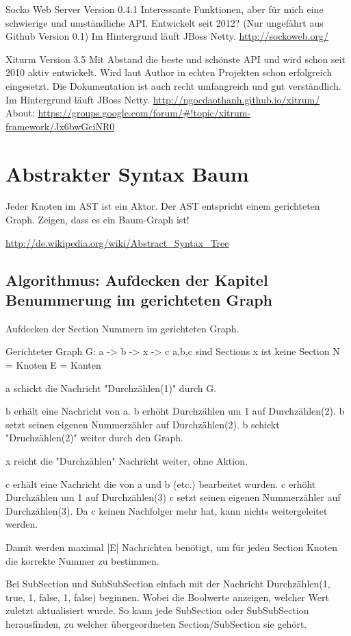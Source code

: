 Socko Web Server Version 0.4.1
Interessante Funktionen, aber für mich eine schwierige und umständliche API.
Entwickelt seit 2012? (Nur ungefährt aus Github Version 0.1)
Im Hintergrund läuft JBoss Netty.
\url{http://sockoweb.org/}

Xiturm Version 3.5
Mit Abstand die beste und schönste API und wird schon seit 2010 aktiv entwickelt.
Wird laut Author in echten Projekten schon erfolgreich eingesetzt.
Die Dokumentation ist auch recht umfangreich und gut verständlich.
Im Hintergrund läuft JBoss Netty.
\url{http://ngocdaothanh.github.io/xitrum/}
About: \url{https://groups.google.com/forum/#!topic/xitrum-framework/Jx6bwGciNR0}


\section{Abstrakter Syntax Baum}

Jeder Knoten im AST ist ein Aktor. Der AST entspricht einem gerichteten Graph.
Zeigen, dass es ein Baum-Graph ist!

\url{http://de.wikipedia.org/wiki/Abstract_Syntax_Tree}


\subsection{Algorithmus: Aufdecken der Kapitel Benummerung im gerichteten Graph}

Aufdecken der Section Nummern im gerichteten Graph.

Gerichteter Graph G: a -> b -> x -> c
a,b,c sind Sections
x ist keine Section
N = Knoten
E = Kanten

a schickt die Nachricht "Durchzählen(1)" durch G.

b erhält eine Nachricht von a.
b erhöht Durchzählen um 1 auf Durchzählen(2).
b setzt seinen eigenen Nummerzähler auf Durchzählen(2).
b schickt "Druchzählen(2)" weiter durch den Graph.

x reicht die "Durchzählen" Nachricht weiter, ohne Aktion.

c erhält eine Nachricht die von a und b (etc.) bearbeitet wurden.
c erhöht Durchzählen um 1 auf Durchzählen(3)
c setzt seinen eigenen Nummerzähler auf Durchzählen(3).
Da c keinen Nachfolger mehr hat, kann nichts weitergeleitet werden.

Damit werden maximal |E| Nachrichten benötigt, um für jeden Section Knoten
die korrekte Nummer zu bestimmen.


Bei SubSection und SubSubSection einfach mit der
Nachricht Durchzählen(1, true, 1, false, 1, false) beginnen.
Wobei die Boolwerte anzeigen, welcher Wert zuletzt aktualisiert wurde.
So kann jede SubSection oder SubSubSection herausfinden, zu welcher
übergeordneten Section/SubSection sie gehört.

